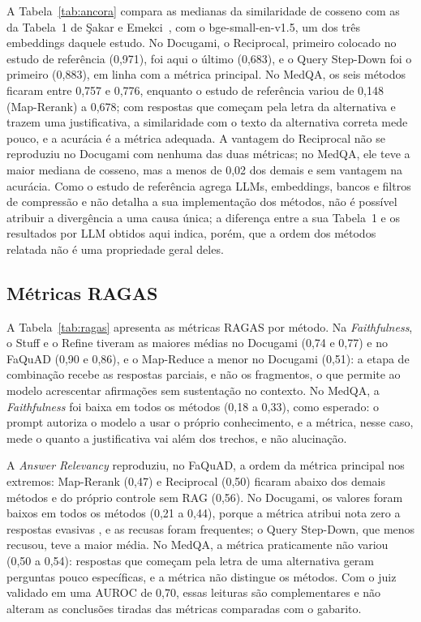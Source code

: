 
A Tabela~\ref{tab:ancora} compara as medianas da similaridade de cosseno com as da Tabela~1 de Şakar e Emekci~\cite{sakar2025rag}, com o bge-small-en-v1.5, um dos três embeddings daquele estudo. No Docugami, o Reciprocal, primeiro colocado no estudo de referência (0,971), foi aqui o último (0,683), e o Query Step-Down foi o primeiro (0,883), em linha com a métrica principal. No MedQA, os seis métodos ficaram entre 0,757 e 0,776, enquanto o estudo de referência variou de 0,148 (Map-Rerank) a 0,678; com respostas que começam pela letra da alternativa e trazem uma justificativa, a similaridade com o texto da alternativa correta mede pouco, e a acurácia é a métrica adequada. A vantagem do Reciprocal não se reproduziu no Docugami com nenhuma das duas métricas; no MedQA, ele teve a maior mediana de cosseno, mas a menos de 0,02 dos demais e sem vantagem na acurácia. Como o estudo de referência agrega LLMs, embeddings, bancos e filtros de compressão e não detalha a sua implementação dos métodos, não é possível atribuir a divergência a uma causa única; a diferença entre a sua Tabela~1 e os resultados por LLM obtidos aqui indica, porém, que a ordem dos métodos relatada não é uma propriedade geral deles.

\subsection{Métricas RAGAS}
\label{ssc:ragas}

A Tabela~\ref{tab:ragas} apresenta as métricas RAGAS por método. Na \emph{Faithfulness}, o Stuff e o Refine tiveram as maiores médias no Docugami (0,74 e 0,77) e no FaQuAD (0,90 e 0,86), e o Map-Reduce a menor no Docugami (0,51): a etapa de combinação recebe as respostas parciais, e não os fragmentos, o que permite ao modelo acrescentar afirmações sem sustentação no contexto. No MedQA, a \emph{Faithfulness} foi baixa em todos os métodos (0,18 a 0,33), como esperado: o prompt autoriza o modelo a usar o próprio conhecimento, e a métrica, nesse caso, mede o quanto a justificativa vai além dos trechos, e não alucinação.


A \emph{Answer Relevancy} reproduziu, no FaQuAD, a ordem da métrica principal nos extremos: Map-Rerank (0,47) e Reciprocal (0,50) ficaram abaixo dos demais métodos e do próprio controle sem RAG (0,56). No Docugami, os valores foram baixos em todos os métodos (0,21 a 0,44), porque a métrica atribui nota zero a respostas evasivas \cite{es2024ragas}, e as recusas foram frequentes; o Query Step-Down, que menos recusou, teve a maior média. No MedQA, a métrica praticamente não variou (0,50 a 0,54): respostas que começam pela letra de uma alternativa geram perguntas pouco específicas, e a métrica não distingue os métodos. Com o juiz validado em uma AUROC de 0,70, essas leituras são complementares e não alteram as conclusões tiradas das métricas comparadas com o gabarito.


